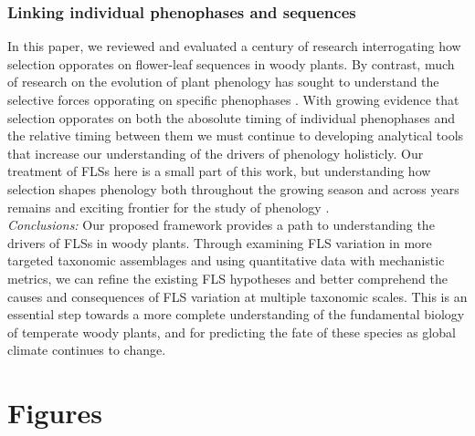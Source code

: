 \documentclass{article}
\begin{document}
\subsubsection*{Linking individual phenophases and sequences} %
\noindent In this paper, we reviewed and evaluated a century of research interrogating how selection opporates on flower-leaf sequences in woody plants. By contrast, much of research on the evolution of plant phenology has sought to understand the selective forces opporating on specific phenophases  \citep[e.g.][]{Savage2013,OLLERTON_1992} . With growing evidence that selection opporates on both the abosolute timing of individual phenophases and the relative timing between them we must continue to developing analytical tools that increase our understanding of the drivers of phenology holisticly. %
Our treatment of FLSs here is a small part of this work, but understanding how selection shapes phenology both throughout the growing season and across years remains and exciting frontier for the study of phenology \citep{Wolkovich2014b}. \\

\noindent \emph{Conclusions:} Our proposed framework provides a path to understanding the drivers of FLSs in woody plants. Through examining FLS variation in more targeted taxonomic assemblages and using quantitative data with mechanistic metrics, we can refine the existing FLS hypotheses and better comprehend the causes and consequences of FLS variation at multiple taxonomic scales. This is an essential step towards a more complete understanding of the fundamental biology of temperate woody plants, and for predicting the fate of these species as global climate continues to change.



 
\pagebreak

\section*{Figures}
\end{document}
